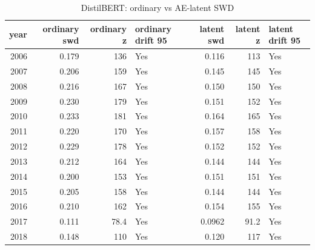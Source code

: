 \begin{table}[ht]
\centering
\caption{DistilBERT: ordinary vs AE-latent SWD}
\label{tab:distilbert_ordinary_vs_latent_swd}
\begin{tabular}{rrrlrrl}
\toprule
year & ordinary swd & ordinary z & ordinary drift 95 & latent swd & latent z & latent drift 95 \\
\midrule
2006 & 0.179 & 136 & Yes & 0.116 & 113 & Yes \\
2007 & 0.206 & 159 & Yes & 0.145 & 145 & Yes \\
2008 & 0.216 & 167 & Yes & 0.150 & 150 & Yes \\
2009 & 0.230 & 179 & Yes & 0.151 & 152 & Yes \\
2010 & 0.233 & 181 & Yes & 0.164 & 165 & Yes \\
2011 & 0.220 & 170 & Yes & 0.157 & 158 & Yes \\
2012 & 0.229 & 178 & Yes & 0.152 & 152 & Yes \\
2013 & 0.212 & 164 & Yes & 0.144 & 144 & Yes \\
2014 & 0.200 & 153 & Yes & 0.151 & 151 & Yes \\
2015 & 0.205 & 158 & Yes & 0.144 & 144 & Yes \\
2016 & 0.210 & 162 & Yes & 0.154 & 155 & Yes \\
2017 & 0.111 & 78.4 & Yes & 0.0962 & 91.2 & Yes \\
2018 & 0.148 & 110 & Yes & 0.120 & 117 & Yes \\
\bottomrule
\end{tabular}
\end{table}
